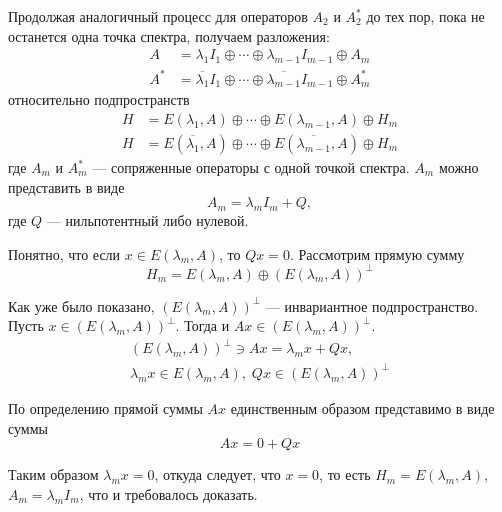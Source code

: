 \begin{proofbreak}
    Продолжая аналогичный процесс для операторов $A_2$ и $A_2^*$ до тех пор,
    пока не останется одна точка спектра, получаем разложения:
    \begin{align*}
        A &= \lambda_1 I_1 \oplus \dotsb \oplus \lambda_{m-1} I_{m-1} \oplus A_m
        \\
        A^* &= \overline{\lambda_1} I_1 \oplus \dotsb \oplus
        \overline{\lambda_{m-1}} I_{m-1} \oplus A_m^*
    \end{align*}
    относительно подпространств
    \begin{align*}
        H &= E(\lambda_1,A) \oplus \dotsb \oplus E(\lambda_{m-1}, A) \oplus H_m
        \\
        H &= E(\overline{\lambda_1},A) \oplus \dotsb \oplus
        E(\overline{\lambda_{m-1}}, A) \oplus H_m
    \end{align*}
    где $A_m$ и $A_m^*$ — сопряженные операторы с одной точкой спектра. $A_m$ можно представить в виде
    \[ A_m = \lambda_m I_m + Q, \]
    где $Q$ — нильпотентный либо нулевой. 
    
    Понятно, что если $x \in E(\lambda_m, A)$, то $Qx = 0$. Рассмотрим прямую
    сумму
    \[ H_m = E(\lambda_m, A) \oplus (E(\lambda_m,A))^\perp \]

    Как уже было показано, $(E(\lambda_m, A))^\perp$ — инвариантное
    подпространство. Пусть $x \in (E(\lambda_m, A))^\perp$. Тогда и $Ax \in
    (E(\lambda_m, A))^\perp$.
    \begin{gather*}
        (E(\lambda_m, A))^\perp \ni Ax = \lambda_m x + Qx,\\
        \lambda_m x \in E(\lambda_m, A), \; Qx \in (E(\lambda_m,A))^\perp
    \end{gather*}

    По определению прямой суммы $Ax$ единственным образом представимо в виде
    суммы
    \[ Ax = 0 + Qx \]

    Таким образом $\lambda_m x = 0$, откуда следует, что $x = 0$, то есть
    $H_m = E(\lambda_m, A)$, $A_m = \lambda_m I_m$, что и требовалось доказать.
\end{proofbreak}
